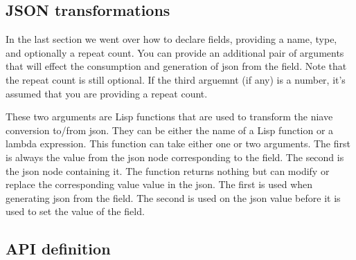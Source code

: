 \documentclass[12pt]{article}
\begin{document}
\subsection{JSON transformations}

In the last section we went over how to declare fields, providing a
name, type, and optionally a repeat count. You can provide an
additional pair of arguments that will effect the consumption and
generation of json from the field. Note that the repeat count is still
optional. If the third arguemnt (if any) is a number, it's assumed
that you are providing a repeat count.

These two arguments are Lisp functions that are used to transform the
niave conversion to/from json. They can be either the name of a Lisp
function or a lambda expression. This function can take either one or
two arguments. The first is always the value from the json node
corresponding to the field. The second is the json node containing it.
The function returns nothing but can modify or replace the
corresponding value value in the json. The first is used when
generating json from the field. The second is used on the json value
before it is used to set the value of the field.

\subsection{API definition}

\begin{verbatim}
  
\end{verbatim}
\end{document}
